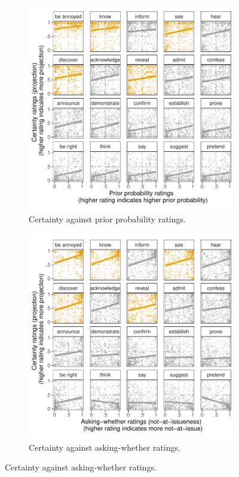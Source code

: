 \documentclass[11pt,fleqn]{article}
\newcommand{\6}{\mbox{$[\hspace*{-.6mm}[$}}
\newcommand{\9}{\mbox{$]\hspace*{-.6mm}]$}}
\begin{document}
\begin{figure}[h!]
\centering
\begin{subfigure}[t]{0.49\textwidth}
\centering
\includegraphics[width=\textwidth]{../../results/exp1/graphs/projection-by-prior}
\caption{Certainty against prior probability ratings.}\label{fig:certainty-by-prior}
\end{subfigure} \hfill \begin{subfigure}[t]{0.49\textwidth}
\centering
\includegraphics[width=\textwidth]{../../results/exp1/graphs/projection-by-ai}
\caption{Certainty against asking-whether ratings.}\label{fig:certainty-by-nai}
 \end{subfigure}
 

\end{figure}
\end{document}

